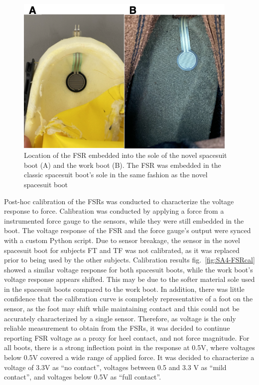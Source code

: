 \documentclass[defaultstyle,11pt]{thesis}
\begin{document}
\hypertarget{fig:SA4-FSRembed}{%
\begin{figure}
\centering
\includegraphics[width=0.95\textwidth,height=\textheight]{../fig/SA4/FSR_embed.png}
\caption[{FSR embedded into soles of test boots}]{Location of the FSR embedded into the sole of the novel spacesuit boot (A) and the work boot (B). The FSR was embedded in the classic spacesuit boot's sole in the same fashion as the novel spacesuit boot}
\label{fig:SA4-FSRembed}
\end{figure}
}

Post-hoc calibration of the FSRs was conducted to characterize the voltage response to force.
Calibration was conducted by applying a force from a instrumented force gauge to the sensors, while they were still embedded in the boot.
The voltage response of the FSR and the force gauge's output were synced with a custom Python script.
Due to sensor breakage, the sensor in the novel spacesuit boot for subjects FT and TF was not calibrated, as it was replaced prior to being used by the other subjects.
Calibration results fig.~\ref{fig:SA4-FSRcal} showed a similar voltage response for both spacesuit boots, while the work boot's voltage response appears shifted.
This may be due to the softer material sole used in the spacesuit boots compared to the work boot.
In addition, there was little confidence that the calibration curve is completely representative of a foot on the sensor, as the foot may shift while maintaining contact and this could not be accurately characterized by a single sensor.
Therefore, as voltage is the only reliable measurement to obtain from the FSRs, it was decided to continue reporting FSR voltage as a proxy for heel contact, and not force magnitude.
For all boots, there is a strong inflection point in the response at 0.5V, where voltages below 0.5V covered a wide range of applied force.
It was decided to characterize a voltage of 3.3V as ``no contact'', voltages between 0.5 and 3.3 V as ``mild contact'', and voltages below 0.5V as ``full contact''.
\end{document}
